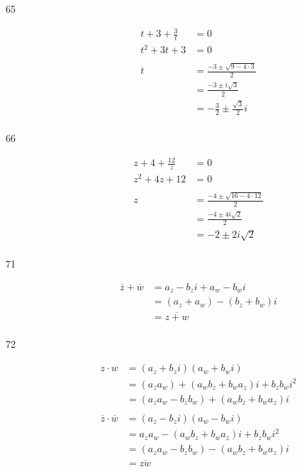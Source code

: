 \documentclass{exam}
\begin{document}
\begin{description}
    \item[65] 
      \begin{align*}
        t + 3 + \frac{3}{t} &= 0 \\
        t^2 + 3t + 3        &= 0 \\
        \\
        t &= \frac{-3 \pm \sqrt{9 - 4 \cdot 3}}{2} \\
          &= \frac{-3 \pm i \sqrt{3}}{2} \\
          &= \boxed{- \frac{3}{2} \pm \frac{\sqrt{3}}{2} i} \\
      \end{align*}

    \item[66] 
      \begin{align*}
        z + 4 + \frac{12}{z} &= 0 \\
        z^2 + 4z + 12        &= 0 \\
        \\
        z &= \frac{-4 \pm \sqrt{16 - 4 \cdot 12}}{2} \\
          &= \frac{-4 \pm 4 i \sqrt{2}}{2} \\
          &= \boxed{-2 \pm 2 i \sqrt{2}} \\
      \end{align*}

    \item[71]
      \begin{align*}
        \overline{z} + \overline{w} &= a_z - b_z i + a_w - b_w i \\
                                    &= (a_z + a_w) - (b_z + b_w) i \\
                                    &= \overline{z + w} \\
      \end{align*}

    \item[72]
      \begin{align*}
        z \cdot w &= (a_z + b_z i) (a_w + b_w i) \\
                  &= (a_z a_w) + (a_w b_z + b_w a_z) i + b_z b_w i^2 \\
                  &= (a_z a_w - b_z b_w) + (a_w b_z + b_w a_z) i \\
                                    \\
        \overline{z} \cdot \overline{w} &= (a_z - b_z i) (a_w - b_w i) \\
                                        &= a_z a_w - (a_w b_z + b_w a_z) i + b_z b_w i^2 \\
                                        &= (a_z a_w - b_z b_w) - (a_w b_z + b_w a_z) i \\
                                        &= \overline{z w} \\
      \end{align*}


\end{description}
\end{document}
